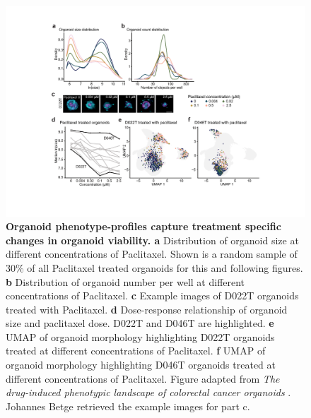 \begin{flushleft}
\begin{figure}[h]
\centering
\includegraphics[width=\textwidth,
                height=\textheight,
                keepaspectratio]{figures/promise/pdf/fig_2_2.pdf}
\caption[Organoid phenotype-profiles capture treatment specific changes in organoid viability]{\textbf{Organoid phenotype-profiles capture treatment specific changes in organoid viability. a} Distribution of organoid size at different concentrations of Paclitaxel. Shown is a random sample of 30\% of all Paclitaxel treated organoids for this and following figures. \textbf{b} Distribution of organoid number per well at different concentrations of Paclitaxel. \textbf{c} Example images of D022T organoids treated with Paclitaxel. \textbf{d} Dose-response relationship of organoid size and paclitaxel dose. D022T and D046T are highlighted. \textbf{e} UMAP of organoid morphology highlighting D022T organoids treated at different concentrations of Paclitaxel. \textbf{f} UMAP of organoid morphology highlighting D046T organoids treated at different concentrations of Paclitaxel. Figure adapted from \textit{The drug-induced phenotypic landscape of colorectal cancer organoids} \parencite{betgeDruginducedPhenotypicLandscape2022}. Johannes Betge retrieved the example images for part c.}
\label{fig_222}
\end{figure}
\bigbreak



\end{flushleft}
